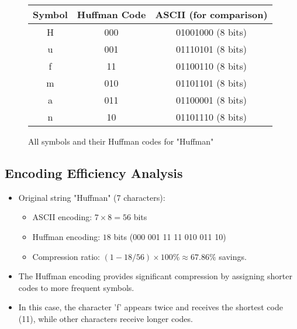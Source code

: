 \begin{figure}[H]  
    \centering    
        \centering  
        \begin{tabular}{|c|c|c|}  
        \hline  
        \rowcolor{gray!30}  
        Symbol & Huffman Code & ASCII (for comparison) \\
        \hline  
        H & 000 & 01001000 (8 bits) \\
        u & 001 & 01110101 (8 bits) \\
        f & 11 & 01100110 (8 bits) \\
        m & 010 & 01101101 (8 bits) \\
        a & 011 & 01100001 (8 bits) \\
        n & 10 & 01101110 (8 bits) \\
        \hline  
        \end{tabular}    
    \caption{All symbols and their Huffman codes for "Huffman"}  
\end{figure}  

\newpage
\subsection{Encoding Efficiency Analysis}  
\begin{itemize}  
    \item Original string "Huffman" (7 characters):  
    \begin{itemize}  
        \item ASCII encoding: $7 \times 8 = 56$ bits  
        \item Huffman encoding: $18$ bits (000 001 11 11 010 011 10)  
        \item Compression ratio: $(1 - 18/56) \times 100\% \approx 67.86\% $ savings. 
    \end{itemize}  
    \item The Huffman encoding provides significant compression by assigning shorter codes to more frequent symbols.  
    \item In this case, the character 'f' appears twice and receives the shortest code (11), while other characters receive longer codes.  
\end{itemize}  
